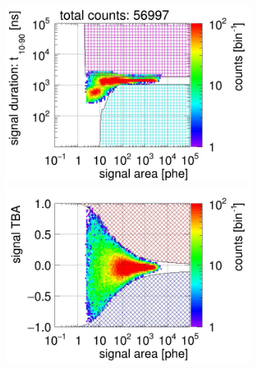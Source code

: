 \begin{landscape}
\begin{figure}[!p]
\begin{subfigure}[t]{0.33\textwidth}
			\caption{}
			\label{fig:signal selection dv 16 03}
		\end{subfigure}
		\begin{subfigure}[t]{0.33\textwidth}
			\centering
			\includegraphics[width=\figurewidth,clip,trim={0 98 0 0}]{Figures/GasTest/CutsValid/res64771/pdpa29Vecfig64771.jpg}
			\includegraphics[width=\figurewidth,clip,trim={0 98 0 40}]{Figures/GasTest/CutsValid/res64771/tbapa29Vecfig64771.jpg}

\end{subfigure}
\end{figure}
\end{landscape}

